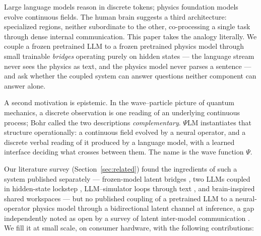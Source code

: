 \documentclass[11pt]{article}
\newcommand{\psilm}{$\Psi$LM}
\begin{document}
Large language models reason in discrete tokens; physics foundation models \citep{barman2025lpm,hao2024dpot} evolve continuous fields. The human brain suggests a third architecture: specialized regions, neither subordinate to the other, co-processing a single task through dense internal communication. This paper takes the analogy literally. We couple a frozen pretrained LLM to a frozen pretrained physics model through small trainable \emph{bridges} operating purely on hidden states --- the language stream never sees the physics as text, and the physics model never parses a sentence --- and ask whether the coupled system can answer questions neither component can answer alone.

A second motivation is epistemic. In the wave--particle picture of quantum mechanics, a discrete observation is one reading of an underlying continuous process; Bohr called the two descriptions \emph{complementary}. \psilm{} instantiates that structure operationally: a continuous field evolved by a neural operator, and a discrete verbal reading of it produced by a language model, with a learned interface deciding what crosses between them. The name is the wave function $\Psi$.

Our literature survey (Section~\ref{sec:related}) found the ingredients of such a system published separately --- frozen-model latent bridges \citep{bansal2024calm,zolna2024gats}, two LLMs coupled in hidden-state lockstep \citep{flamant2026bicameral}, LLM--simulator loops through text \citep{liu2023mindseye,varambally2026zephyrus}, and brain-inspired shared workspaces \citep{vanrullen2021glw,goyal2022workspace} --- but no published coupling of a pretrained LLM to a neural-operator physics model through a bidirectional latent channel at inference, a gap independently noted as open by a survey of latent inter-model communication \citep{liu2026beyondtokens}. We fill it at small scale, on consumer hardware, with the following contributions:
\end{document}
